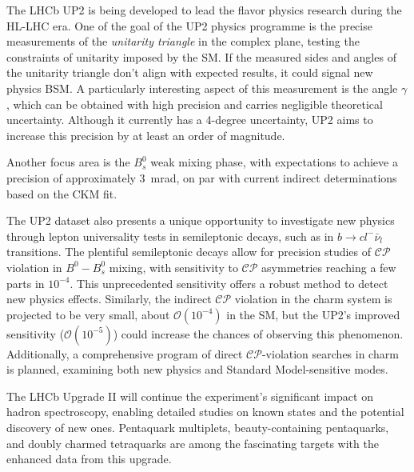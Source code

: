 The LHCb UP2 is being developed to lead the flavor physics research during the HL-LHC era\cite{lhcbcollaboration2019physics}. 
One of the goal of the UP2 physics programme is the precise measurements of the \textit{unitarity triangle} in the complex plane, testing the constraints of unitarity imposed by the SM. If the measured sides and angles of the unitarity triangle don't align with expected results, it could signal new physics BSM\cite{PhysRevLett.10.531, 10.1143/PTP.49.652}.
A particularly interesting aspect of this measurement is the angle $\gamma$, which can be obtained with high precision and carries negligible theoretical uncertainty. Although it currently has a 4-degree uncertainty\cite{LHCb:2021dcr}, UP2 aims to increase this precision by at least an order of magnitude. 

Another focus area is the $B_s^0$ weak mixing phase, with expectations to achieve a precision of approximately \SI{3}{\milli\radian}, on par with current indirect determinations based on the CKM fit.

The UP2 dataset also presents a unique opportunity to investigate new physics through lepton universality tests in semileptonic decays, such as in $b\rightarrow c l^-\bar{\nu}_l$ transitions. The plentiful semileptonic decays allow for precision studies of $\mathcal{CP}$ violation in $B^0-B^0_s$ mixing, with sensitivity to $\mathcal{CP}$ asymmetries reaching a few parts in $10^{−4}$. This unprecedented sensitivity offers a robust method to detect new physics effects. Similarly, the indirect $\mathcal{CP}$ violation in the charm system is projected to be very small, about $\mathcal{O}(10^{-4})$ in the SM, but the UP2's improved sensitivity ($\mathcal{O}(10^{−5})$) could increase the chances of observing this phenomenon. Additionally, a comprehensive program of direct $\mathcal{CP}$-violation searches in charm is planned, examining both new physics and Standard Model-sensitive modes.

The LHCb Upgrade II will continue the experiment's significant impact on hadron spectroscopy, enabling detailed studies on known states and the potential discovery of new ones. Pentaquark multiplets, beauty-containing pentaquarks, and doubly charmed tetraquarks are among the fascinating targets with the enhanced data from this upgrade.



